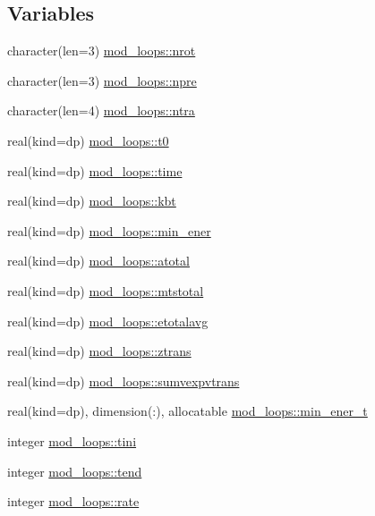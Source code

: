 \subsection*{Variables}
\begin{DoxyCompactItemize}
\item 
character(len=3) \hyperlink{namespacemod__loops_a66417533bb22418eb95ee7ebbff1f850}{mod\+\_\+loops\+::nrot}
\item 
character(len=3) \hyperlink{namespacemod__loops_a920fecb79f5e908fa035a810b4d549ea}{mod\+\_\+loops\+::npre}
\item 
character(len=4) \hyperlink{namespacemod__loops_a79e040eb372f8de350337242a159e2b7}{mod\+\_\+loops\+::ntra}
\item 
real(kind=dp) \hyperlink{namespacemod__loops_ab6a118712ba0b676790e9cace45c35b5}{mod\+\_\+loops\+::t0}
\item 
real(kind=dp) \hyperlink{namespacemod__loops_acb345fb5782ee4c7fd3c419baff2c135}{mod\+\_\+loops\+::time}
\item 
real(kind=dp) \hyperlink{namespacemod__loops_a28f32cc48dca88b5eb914f3b51ff36c4}{mod\+\_\+loops\+::kbt}
\item 
real(kind=dp) \hyperlink{namespacemod__loops_a17eba688dba567d251d70c4c22d9a1cb}{mod\+\_\+loops\+::min\+\_\+ener}
\item 
real(kind=dp) \hyperlink{namespacemod__loops_a16597662d980828d74a9078f4b74e677}{mod\+\_\+loops\+::atotal}
\item 
real(kind=dp) \hyperlink{namespacemod__loops_ae00fd72d753b56050294575eca6b68b1}{mod\+\_\+loops\+::mtstotal}
\item 
real(kind=dp) \hyperlink{namespacemod__loops_ad69a647146ed54f5c84b96e742396716}{mod\+\_\+loops\+::etotalavg}
\item 
real(kind=dp) \hyperlink{namespacemod__loops_a6975a502e7bc56e3b95ee8ed8db8e658}{mod\+\_\+loops\+::ztrans}
\item 
real(kind=dp) \hyperlink{namespacemod__loops_a7c4cc7b204cbf0459e4519befe2b1ef5}{mod\+\_\+loops\+::sumvexpvtrans}
\item 
real(kind=dp), dimension(\+:), allocatable \hyperlink{namespacemod__loops_a285da08b33e0b132d883ee82f39f6ea2}{mod\+\_\+loops\+::min\+\_\+ener\+\_\+t}
\item 
integer \hyperlink{namespacemod__loops_adc96eb69b7265038868c81104240ee96}{mod\+\_\+loops\+::tini}
\item 
integer \hyperlink{namespacemod__loops_a67ea99979384ac6268ae84f7bd2773ec}{mod\+\_\+loops\+::tend}
\item 
integer \hyperlink{namespacemod__loops_ab4cd7025ac3ba99baaa6d706f7c7cdb7}{mod\+\_\+loops\+::rate}
\end{DoxyCompactItemize}
